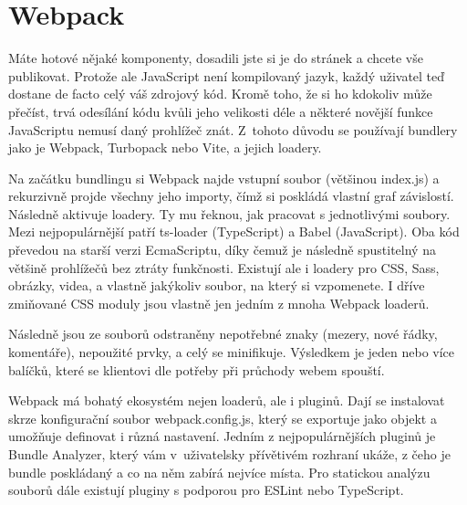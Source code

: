 \section{Webpack}

Máte hotové nějaké komponenty, dosadili jste si je do stránek a chcete vše publikovat. Protože ale JavaScript není kompilovaný jazyk, každý uživatel teď dostane de facto celý váš zdrojový kód. Kromě toho, že si ho kdokoliv může přečíst, trvá odesílání kódu kvůli jeho velikosti déle a některé novější funkce JavaScriptu nemusí daný prohlížeč znát. Z~tohoto důvodu se používají bundlery jako je Webpack\cite{Webpack}\cite{WebpackFireship}, Turbopack nebo Vite, a jejich loadery.

Na začátku bundlingu si Webpack najde vstupní soubor (většinou index.js) a rekurzivně projde všechny jeho importy\cite{WebpackConcepts}\cite{WebpackFounder}, čímž si poskládá vlastní graf závislostí\cite{WebpackDependency}. Následně aktivuje loadery. Ty mu řeknou, jak pracovat s jednotlivými soubory. Mezi nejpopulárnější patří ts-loader (TypeScript) a Babel (JavaScript). Oba kód převedou na starší verzi EcmaScriptu, díky čemuž je následně spustitelný na většině prohlížečů bez ztráty funkčnosti. Existují ale i loadery pro CSS, Sass, obrázky, videa, a vlastně jakýkoliv soubor, na který si vzpomenete. I dříve zmiňované CSS moduly jsou vlastně jen jedním z mnoha Webpack loaderů.

Následně jsou ze souborů odstraněny nepotřebné znaky (mezery, nové řádky, komentáře), nepoužité prvky, a celý se minifikuje. Výsledkem je jeden nebo více balíčků, které se klientovi dle potřeby při průchody webem spouští.

Webpack má bohatý ekosystém nejen loaderů, ale i pluginů. Dají se instalovat skrze konfigurační soubor webpack.config.js, který se exportuje jako objekt a umožňuje definovat i různá nastavení. Jedním z nejpopulárnějších pluginů je Bundle Analyzer, který vám v~uživatelsky přívětivém rozhraní ukáže, z čeho je bundle poskládaný a co na něm zabírá nejvíce místa. Pro statickou analýzu souborů dále existují pluginy s podporou pro ESLint nebo TypeScript.